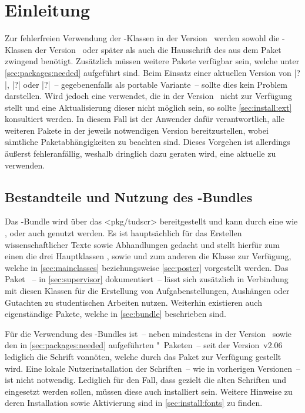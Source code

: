 \chapter{Einleitung}
%
Zur fehlerfreien Verwendung der \TUDScript-Klassen in der Version~\vTUDScript{} 
werden sowohl die \KOMAScript-Klassen der Version~\vKOMAScript{} oder später 
als auch die Hausschrift des \CDs \OpenSans aus dem Paket  
zwingend benötigt. Zusätzlich müssen weitere Pakete verfügbar sein, welche 
unter \autoref{sec:packages:needed} aufgeführt sind. Beim Einsatz einer 
aktuellen Version von \TeXLive|?|, \MacTeX|?| oder \MiKTeX|?|~-- gegebenenfalls 
als portable Variante~-- sollte dies kein Problem darstellen. Wird jedoch eine 
\DistributionGeneral verwendet, die \TUDScript in der Version~\vTUDScript{} 
nicht zur Verfügung stellt und eine Aktualisierung dieser nicht möglich sein, 
so sollte \autoref{sec:install:ext} konsultiert werden. In diesem Fall ist der 
Anwender dafür verantwortlich, alle weiteren Pakete in der jeweils notwendigen 
Version bereitzustellen, wobei sämtliche Paketabhängigkeiten zu beachten sind. 
Dieses Vorgehen ist allerdings äußerst fehleranfällig, weshalb dringlich dazu 
geraten wird, eine aktuelle \DistributionGeneral zu verwenden.



\section{Bestandteile und Nutzung des \TUDScript-Bundles}
%
%
%
Das \TUDScript-Bundle wird über das \CTAN<pkg/tudscr> bereitgestellt und kann 
durch eine \DistributionGeneral wie \TeXLive, \MacTeX oder auch \MiKTeX genutzt 
werden. Es ist hauptsächlich für das Erstellen wissenschaftlicher Texte sowie 
Abhandlungen gedacht und stellt hierfür zum einen die drei Hauptklassen 
,  sowie  und zum 
anderen die Klasse  zur Verfügung, welche in 
\autoref{sec:mainclasses} beziehungsweise \autoref{sec:poster} vorgestellt 
werden. Das Paket ~-- in \autoref{sec:supervisor} 
dokumentiert~-- lässt sich zusätzlich in Verbindung mit diesen Klassen für die 
Erstellung von Aufgabenstellungen, Aushängen oder Gutachten zu studentischen 
Arbeiten nutzen. Weiterhin existieren auch eigenständige Pakete, welche in 
\autoref{sec:bundle} beschrieben sind. 

Für die Verwendung des \TUDScript-Bundles ist~-- neben \KOMAScript mindestens 
in der Version~\vKOMAScript{} sowie den in \autoref{sec:packages:needed} 
aufgeführten "~Paketen~-- seit der Version~v2.06 lediglich die 
Schrift \OpenSans vonnöten, welche durch das Paket  zur 
Verfügung gestellt wird. Eine lokale Nutzerinstallation der Schriften~-- wie in 
vorherigen Versionen~-- ist nicht notwendig. Lediglich für den Fall, dass 
gezielt die alten Schriften \Univers und \DIN eingesetzt werden sollen, müssen 
diese auch installiert sein. Weitere Hinweise zu deren Installation sowie 
Aktivierung sind in \autoref{sec:install:fonts} zu finden.

